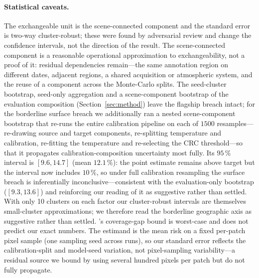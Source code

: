 \documentclass[preprint,3p,times]{elsarticle}
\begin{document}
\paragraph{Statistical caveats.} The exchangeable unit is the scene-connected component and the standard error is two-way cluster-robust; these were found by adversarial review and change the confidence intervals, not the direction of the result. The scene-connected component is a reasonable operational approximation to exchangeability, not a proof of it: residual dependencies remain---the same annotation region on different dates, adjacent regions, a shared acquisition or atmospheric system, and the reuse of a component across the Monte-Carlo splits. The seed-cluster bootstrap, seed-only aggregation and a scene-component bootstrap of the evaluation composition (Section~\ref{sec:method}) leave the flagship breach intact; for the borderline surface breach we additionally ran a nested scene-component bootstrap that re-runs the entire calibration pipeline on each of $1500$ resamples---re-drawing source and target components, re-splitting temperature and calibration, re-fitting the temperature and re-selecting the CRC threshold---so that it propagates calibration-composition uncertainty most fully. Its $95\,\%$ interval is $[9.6, 14.7]$ (mean $12.1\,\%$): the point estimate remains above target but the interval now includes $10\,\%$, so under full calibration resampling the surface breach is inferentially inconclusive---consistent with the evaluation-only bootstrap ($[9.3, 13.6]$) and reinforcing our reading of it as suggestive rather than settled. With only 10 clusters on each factor our cluster-robust intervals are themselves small-cluster approximations; we therefore read the borderline geographic axis as suggestive rather than settled. \citet{barber2023}'s coverage-gap bound is worst-case and does not predict our exact numbers. The estimand is the mean risk on a fixed per-patch pixel sample (one sampling seed across runs), so our standard error reflects the calibration-split and model-seed variation, not pixel-sampling variability---a residual source we bound by using several hundred pixels per patch but do not fully propagate.
\end{document}
